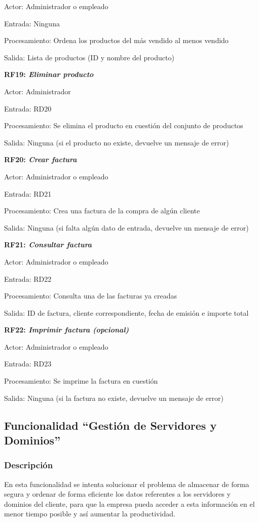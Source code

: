 \documentclass[paper=a4, fontsize=11pt, spanish]{scrartcl}
\begin{document}
Actor: Administrador o empleado

Entrada: Ninguna

Procesamiento: Ordena los productos del más vendido al menos vendido

Salida: Lista de productos (ID y nombre del producto)

\setlength{\parindent}{0em}
\textbf{RF19: \textit{Eliminar producto}}
\setlength{\parindent}{2em}

Actor: Administrador

Entrada: RD20

Procesamiento: Se elimina el producto en cuestión del conjunto de productos

Salida: Ninguna (si el producto no existe, devuelve un mensaje de error)

\setlength{\parindent}{0em}
\textbf{RF20: \textit{Crear factura}}
\setlength{\parindent}{2em}

Actor: Administrador o empleado

Entrada: RD21

Procesamiento: Crea una factura de la compra de algún cliente

Salida: Ninguna (si falta algún dato de entrada, devuelve un mensaje de error)

\setlength{\parindent}{0em}
\textbf{RF21: \textit{Consultar factura}}
\setlength{\parindent}{2em}

Actor: Administrador o empleado

Entrada: RD22

Procesamiento: Consulta una de las facturas ya creadas

Salida: ID de factura, cliente correspondiente, fecha de emisión e importe total

\setlength{\parindent}{0em}
\textbf{RF22: \textit{Imprimir factura (opcional)}}
\setlength{\parindent}{2em}

Actor: Administrador o empleado

Entrada: RD23

Procesamiento: Se imprime la factura en cuestión

Salida: Ninguna (si la factura no existe, devuelve un mensaje de error)

\subsection{Funcionalidad “Gestión de Servidores y Dominios”}

\subsubsection{Descripción}
\setlength{\parindent}{3em} En esta funcionalidad se intenta solucionar el problema de almacenar de forma segura y ordenar de forma eficiente los datos referentes a los servidores y dominios del cliente, para que la empresa pueda acceder a esta información en el menor tiempo posible y así aumentar la productividad. 
\end{document}
